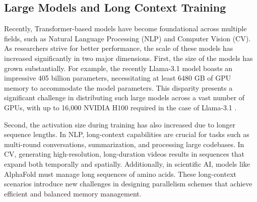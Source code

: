 \documentclass[sigplan,review]{acmart}
\begin{document}
\subsection{Large Models and Long Context Training}
Recently, Transformer-based models \cite{vaswani2023attention, brown2020language, devlin2018bert, touvron2023llama, peebles2023scalablediffusionmodelstransformers, dosovitskiy2021vit} have become foundational across multiple fields, such as Natural Language Processing (NLP) and Computer Vision (CV). As researchers strive for better performance, the scale of these models has increased significantly in two major dimensions. First, the size of the models has grown substantially. For example, the recently Llama-3.1 model \cite{dubey2024llama3herdmodels} boasts an impressive 405 billion parameters, necessitating at least 6480 GB of GPU memory to accommodate the model parameters. This disparity presents a significant challenge in distributing such large models across a vast number of GPUs, with up to 16,000 NVIDIA H100 required in the case of Llama-3.1 \cite{dubey2024llama3herdmodels}.

Second, the activation size during training has also increased due to longer sequence lengths. In NLP, long-context capabilities are crucial for tasks such as multi-round conversations\cite{openai2023gpt4}, summarization\cite{Koh2022AnES, beltagy2020longformer}, and processing large codebases\cite{li2023starcodersourceyou, rozière2024codellamaopenfoundation, chowdhery2022palmscalinglanguagemodeling}. In CV, generating high-resolution, long-duration videos\cite{Brooks_2024, peebles2023scalable} results in sequences that expand both temporally and spatially. Additionally, in scientific AI, models like AlphaFold \cite{Jumper2021Alphafold, cheng2023fastfold} must manage long sequences of amino acids. These long-context scenarios introduce new challenges in designing parallelism schemes that achieve efficient and balanced memory management.
\end{document}
